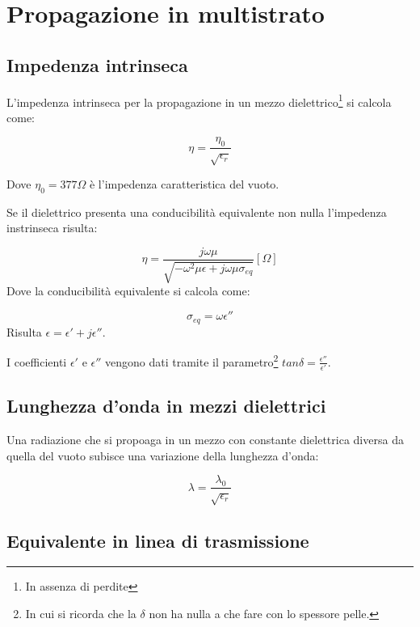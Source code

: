 		
\chapter{Propagazione in multistrato}

	\section{Impedenza intrinseca}

		L'impedenza intrinseca per la propagazione in un mezzo dielettrico\footnote{In assenza di perdite} si calcola come:

		\begin{equation}
		\eta=\frac{\eta_0}{\sqrt{\epsilon_r}}
		\end{equation}

		Dove $\eta_0=377\Omega$ è l'impedenza caratteristica del vuoto.

		Se il dielettrico presenta una conducibilità equivalente non nulla l'impedenza instrinseca risulta:

		\begin{equation}
		\eta=\frac{j\omega\mu}{\sqrt{-\omega^2\mu\epsilon+j\omega\mu\sigma_{eq}}} [  \Omega  ]
		\end{equation}
		Dove la conducibilità equivalente si calcola come:

		\begin{equation}
		\sigma_{eq}=\omega \epsilon''
		\end{equation}
		Risulta $\epsilon=\epsilon'+j\epsilon''$.
		
		I coefficienti $\epsilon'$ e $\epsilon''$ vengono dati tramite il parametro\footnote{In cui si ricorda che la $\delta$ non ha nulla a che fare con lo spessore pelle.} $tan\delta=\frac{\epsilon''}{\epsilon'}$.

	\section{Lunghezza d'onda in mezzi dielettrici}
		Una radiazione che si propoaga in un mezzo con constante dielettrica diversa da quella del vuoto subisce una variazione della lunghezza d'onda:

		\begin{equation} 
		\lambda = \frac {\lambda_0} {\sqrt {\epsilon_r} }
		\end{equation} 

	\section{Equivalente in linea di trasmissione}

